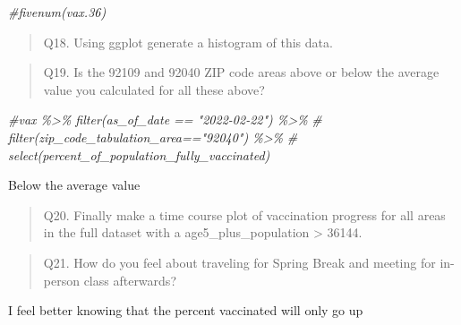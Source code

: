 \documentclass[
]{article}
\newenvironment{Shaded}{\begin{snugshade}}{\end{snugshade}}
\newcommand{\CommentTok}[1]{\textcolor[rgb]{0.56,0.35,0.01}{\textit{#1}}}
\begin{document}
\begin{Shaded}
\begin{Highlighting}[]
\CommentTok{\#fivenum(vax.36)}
\end{Highlighting}
\end{Shaded}

\begin{quote}
Q18. Using ggplot generate a histogram of this data.
\end{quote}

\begin{Shaded}
\end{Shaded}

\begin{quote}
Q19. Is the 92109 and 92040 ZIP code areas above or below the average
value you calculated for all these above?
\end{quote}

\begin{Shaded}
\begin{Highlighting}[]
\CommentTok{\#vax \%\textgreater{}\% filter(as\_of\_date == "2022{-}02{-}22") \%\textgreater{}\%  }
\CommentTok{\#  filter(zip\_code\_tabulation\_area=="92040") \%\textgreater{}\%}
\CommentTok{\#  select(percent\_of\_population\_fully\_vaccinated)}
\end{Highlighting}
\end{Shaded}

Below the average value

\begin{quote}
Q20. Finally make a time course plot of vaccination progress for all
areas in the full dataset with a age5\_plus\_population \textgreater{}
36144.
\end{quote}

\begin{Shaded}
\end{Shaded}

\begin{quote}
Q21. How do you feel about traveling for Spring Break and meeting for
in-person class afterwards?
\end{quote}

I feel better knowing that the percent vaccinated will only go up
\end{document}
